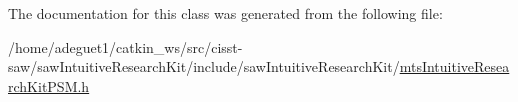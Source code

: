 The documentation for this class was generated from the following file\-:\begin{DoxyCompactItemize}
\item 
/home/adeguet1/catkin\-\_\-ws/src/cisst-\/saw/saw\-Intuitive\-Research\-Kit/include/saw\-Intuitive\-Research\-Kit/\hyperlink{mts_intuitive_research_kit_p_s_m_8h}{mts\-Intuitive\-Research\-Kit\-P\-S\-M.\-h}\end{DoxyCompactItemize}
